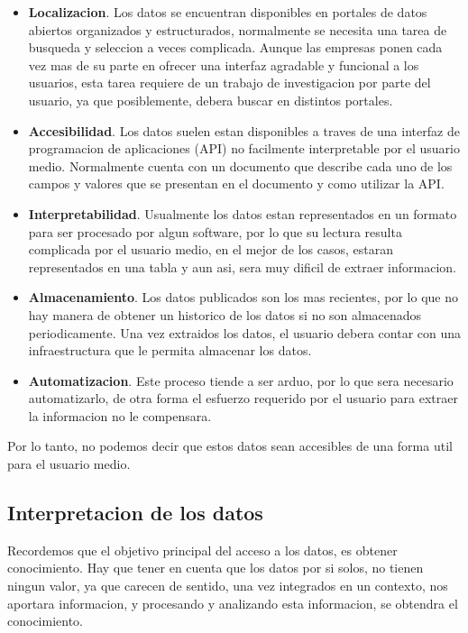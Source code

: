     \begin{itemize}
        \item \textbf{Localizacion}. Los datos se encuentran disponibles en portales de datos abiertos organizados 
        y estructurados, normalmente se necesita una tarea de busqueda y seleccion
        a veces complicada. Aunque las empresas ponen cada vez mas de su parte en ofrecer una interfaz 
        agradable y funcional a los usuarios, esta tarea requiere de un trabajo de investigacion por parte del usuario,
        ya que posiblemente, debera buscar en distintos portales.
        \item \textbf{Accesibilidad}. Los datos suelen estan disponibles a traves de una interfaz de programacion 
        de aplicaciones (API) no facilmente interpretable por el usuario medio. Normalmente cuenta con 
        un documento que describe cada uno de los campos y valores que se presentan en el documento y como utilizar la API.
        \item \textbf{Interpretabilidad}. Usualmente los datos estan representados en un formato para ser procesado por 
        algun software, por lo que su lectura resulta complicada por el usuario medio, en el mejor de los casos, 
        estaran representados en una tabla y aun asi, sera muy dificil de extraer informacion.
        \item \textbf{Almacenamiento}. Los datos publicados son los mas recientes, por lo que no hay manera de obtener 
        un historico de los datos si no son almacenados periodicamente. Una vez extraidos los datos, el usuario debera 
        contar con una infraestructura que le permita almacenar los datos.
        \item \textbf{Automatizacion}. Este proceso tiende a ser arduo, por lo que sera necesario automatizarlo, de otra 
        forma el esfuerzo requerido por el usuario para extraer la informacion no le compensara.
         
    \end{itemize}
    
Por lo tanto, no podemos decir que estos datos sean accesibles de una forma util para el usuario medio.\\

\subsection{Interpretacion de los datos}

Recordemos que el objetivo principal del acceso a los datos, es obtener conocimiento. Hay que tener en 
cuenta que los datos por si solos, no tienen ningun valor, ya que carecen de sentido, una vez integrados en un contexto,
nos aportara informacion, y procesando y analizando esta informacion, se obtendra el conocimiento.\\
    
